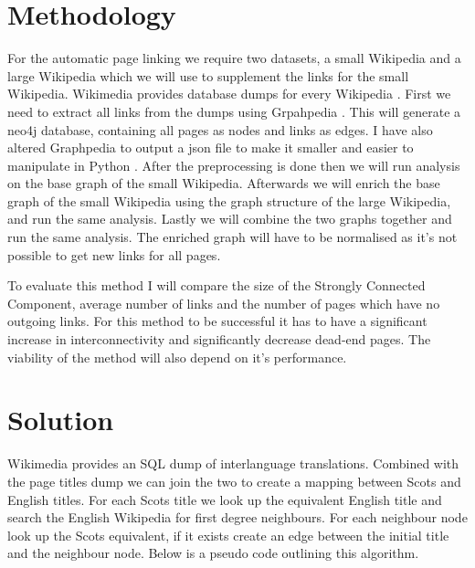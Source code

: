 \documentclass[11pt]{amsart}
\begin{document}
\begin{multicols}{2}
\section{Methodology}
For the automatic page linking we require two datasets, a small Wikipedia and a large Wikipedia which we will use to supplement the links for the small Wikipedia.
Wikimedia provides database dumps for every Wikipedia \cite{wikimedia_dumps}. First we need to extract all links from the dumps using Grpahpedia \cite{graphipedia}
. This will generate a neo4j database, containing all pages as nodes and links as edges. I have also altered Graphpedia to output a json file to make it smaller and easier to manipulate in Python \cite{graphipedia-michael}. After the preprocessing is done then we will run analysis on the base graph of the small Wikipedia. Afterwards we will enrich the base graph of the small Wikipedia using the graph structure of the large Wikipedia, and run the same analysis. Lastly we will combine the two graphs together and run the same analysis. The enriched graph will have to be normalised as it's not possible to get new links for all pages.

To evaluate this method I will compare the size of the Strongly Connected Component, average number of links and the number of pages which have no outgoing links. For this method to be successful it has to have a significant increase in interconnectivity and significantly decrease dead-end pages. The viability of the method will also depend on it's performance.


\section{Solution}
Wikimedia provides an SQL dump of interlanguage translations. Combined with the page titles dump we can join the two to create a mapping between Scots and English titles. For each Scots title we look up the equivalent English title and search the English Wikipedia for first degree neighbours. For each neighbour node look up the Scots equivalent, if it exists create an edge between the initial title and the neighbour node. Below is a pseudo code outlining this algorithm.
\\

\begin{algorithm}[H]
	

\end{algorithm}
\end{multicols}
\end{document}

